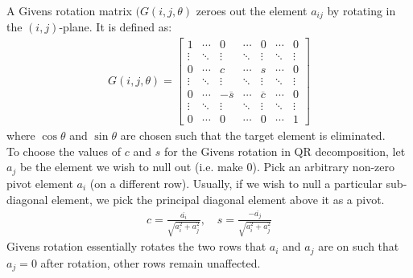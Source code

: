\documentclass[journal]{IEEEtran}
\begin{document}
A Givens rotation matrix $(G(i,j,\theta)$ zeroes out the element $a_{ij}$ by rotating in the $(i,j)$-plane. It is defined as:
\begin{align*}
G(i, j, \theta) = \begin{bmatrix}
1 & \cdots & 0 & \cdots & 0 & \cdots & 0 \\
\vdots & \ddots & \vdots & \ddots & \vdots & \ddots & \vdots \\
0 & \cdots & c & \cdots & s & \cdots & 0 \\
\vdots & \ddots & \vdots & \ddots & \vdots & \ddots & \vdots \\
0 & \cdots & -\overline{s} & \cdots & \overline{c} & \cdots & 0 \\
\vdots & \ddots & \vdots & \ddots & \vdots & \ddots & \vdots \\
0 & \cdots & 0 & \cdots & 0 & \cdots & 1
\end{bmatrix}
\end{align*}
where $\cos\theta$ and $\sin\theta$ are chosen such that the target element is eliminated.\\
To choose the values of $c$ and $s$ for the Givens rotation in QR decomposition, let $a_j$ be the element we wish to null out (i.e. make 0). Pick an arbitrary non-zero pivot element $a_i$ (on a different row). Usually, if we wish to null a particular sub-diagonal element, we pick the principal diagonal element above it as a pivot.
\begin{align*}
c = \frac{\overline{a_{i}}}{\sqrt{a_{i}^2 + a_{j}^2}}, \quad s = \frac{-\overline{a_{j}}}{\sqrt{a_{i}^2 + a_{j}^2}}
\end{align*}
Givens rotation essentially rotates the two rows that $a_i$ and $a_j$ are on such that $a_j = 0$ after rotation, other rows remain unaffected. 
\end{document}
